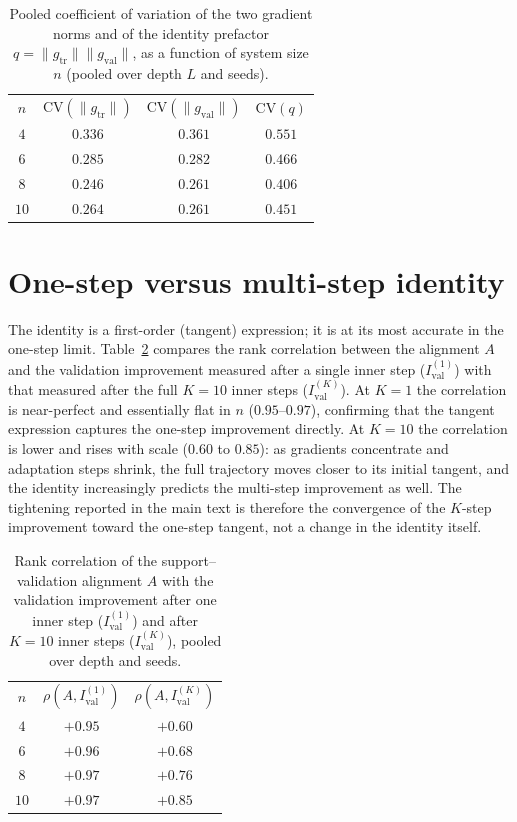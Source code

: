\documentclass[aps,pra,onecolumn,superscriptaddress,10pt]{revtex4-2}
\newcommand{\CV}{\mathrm{CV}}
\newcommand{\Ival}{I_{\mathrm{val}}}
\newcommand{\gtr}{g_{\mathrm{tr}}}
\newcommand{\gval}{g_{\mathrm{val}}}
\begin{document}
\begin{table}[h]
\caption{\label{tab:cv}%
Pooled coefficient of variation of the two gradient norms and of the identity prefactor
$q=\|\gtr\|\|\gval\|$, as a function of system size $n$ (pooled over depth $L$ and seeds).}
\begin{ruledtabular}
\begin{tabular}{cccc}
$n$ & $\CV(\|\gtr\|)$ & $\CV(\|\gval\|)$ & $\CV(q)$ \\
\colrule
$4$  & $0.336$ & $0.361$ & $0.551$ \\
$6$  & $0.285$ & $0.282$ & $0.466$ \\
$8$  & $0.246$ & $0.261$ & $0.406$ \\
$10$ & $0.264$ & $0.261$ & $0.451$ \\
\end{tabular}
\end{ruledtabular}
\end{table}

\section{One-step versus multi-step identity}
\label{sm:kstep}

The identity is a first-order (tangent) expression; it is at its most accurate in the one-step limit.
Table~\ref{tab:kstep} compares the rank correlation between the alignment $A$ and the validation
improvement measured after a single inner step ($\Ival^{(1)}$) with that measured after the full
$K=10$ inner steps ($\Ival^{(K)}$). At $K=1$ the correlation is near-perfect and essentially flat in
$n$ ($0.95$--$0.97$), confirming that the tangent expression captures the one-step improvement
directly. At $K=10$ the correlation is lower and rises with scale ($0.60$ to $0.85$): as gradients
concentrate and adaptation steps shrink, the full trajectory moves closer to its initial tangent, and
the identity increasingly predicts the multi-step improvement as well. The tightening reported in the
main text is therefore the convergence of the $K$-step improvement toward the one-step tangent, not a
change in the identity itself.

\begin{table}[h]
\caption{\label{tab:kstep}%
Rank correlation of the support--validation alignment $A$ with the validation improvement after one
inner step ($\Ival^{(1)}$) and after $K=10$ inner steps ($\Ival^{(K)}$), pooled over depth and seeds.}
\begin{ruledtabular}
\begin{tabular}{ccc}
$n$ & $\rho(A,\Ival^{(1)})$ & $\rho(A,\Ival^{(K)})$ \\
\colrule
$4$  & $+0.95$ & $+0.60$ \\
$6$  & $+0.96$ & $+0.68$ \\
$8$  & $+0.97$ & $+0.76$ \\
$10$ & $+0.97$ & $+0.85$ \\
\end{tabular}
\end{ruledtabular}
\end{table}
\end{document}
